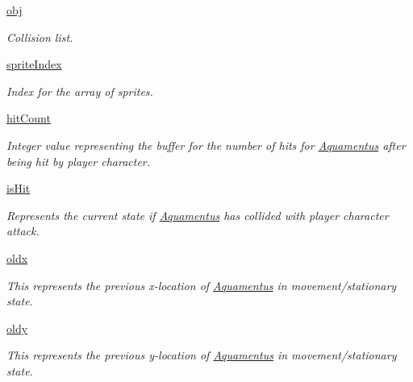 \begin{DoxyCompactItemize}
\mbox{\label{classactor_1_1aquamentus_1_1_aquamentus_a66f41eed56eff4a71e1bd191fa401afc}} 
\hyperlink{classactor_1_1aquamentus_1_1_aquamentus_a66f41eed56eff4a71e1bd191fa401afc}{obj}
\begin{DoxyCompactList}\small\item\em Collision list. \end{DoxyCompactList}\item 
\mbox{\label{classactor_1_1aquamentus_1_1_aquamentus_a7b369f65489176836b8f7108419f17a4}} 
\hyperlink{classactor_1_1aquamentus_1_1_aquamentus_a7b369f65489176836b8f7108419f17a4}{sprite\+Index}
\begin{DoxyCompactList}\small\item\em Index for the array of sprites. \end{DoxyCompactList}\item 
\hyperlink{classactor_1_1aquamentus_1_1_aquamentus_ade0294266872c152be5a7ae1c1b14fc6}{hit\+Count}
\begin{DoxyCompactList}\small\item\em Integer value representing the buffer for the number of hits for \hyperlink{classactor_1_1aquamentus_1_1_aquamentus}{Aquamentus} after being hit by player character. \end{DoxyCompactList}\item 
\hyperlink{classactor_1_1aquamentus_1_1_aquamentus_a6acef447408a84f5af003f3cf74dec7c}{is\+Hit}
\begin{DoxyCompactList}\small\item\em Represents the current state if \hyperlink{classactor_1_1aquamentus_1_1_aquamentus}{Aquamentus} has collided with player character attack. \end{DoxyCompactList}\item 
\hyperlink{classactor_1_1aquamentus_1_1_aquamentus_a462a8a223836cc3b1154ba73cbcd4703}{oldx}
\begin{DoxyCompactList}\small\item\em This represents the previous x-\/location of \hyperlink{classactor_1_1aquamentus_1_1_aquamentus}{Aquamentus} in movement/stationary state. \end{DoxyCompactList}\item 
\hyperlink{classactor_1_1aquamentus_1_1_aquamentus_a985f847ed6c6df6d09232a42f8263b8c}{oldy}
\begin{DoxyCompactList}\small\item\em This represents the previous y-\/location of \hyperlink{classactor_1_1aquamentus_1_1_aquamentus}{Aquamentus} in movement/stationary state. \end{DoxyCompactList}\end{DoxyCompactItemize}


